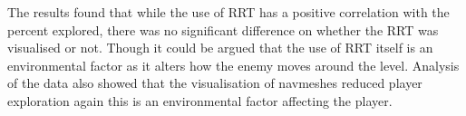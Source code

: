 \documentclass[journal]{IEEEtran}
\begin{document}
	The results found that while the use of RRT has a positive correlation with the percent explored, there was no significant difference on whether the RRT was visualised or not.  Though it could be argued that the use of RRT itself is an environmental factor as it alters how the enemy moves around the level.  Analysis of the data also showed that the visualisation of navmeshes reduced player exploration again this is an environmental factor affecting the player.
	
	
	
	
	
	
	
	\appendices
	
	
	
\end{document}
